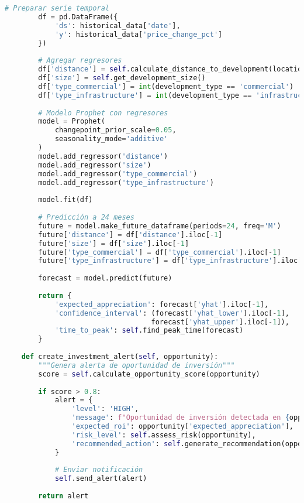 \documentclass[12pt,a4paper]{article}
\begin{document}
\begin{lstlisting}[language=Python, caption=Detección de cambios urbanos y predicción de plusvalía]
        # Preparar serie temporal
        df = pd.DataFrame({
            'ds': historical_data['date'],
            'y': historical_data['price_change_pct']
        })
        
        # Agregar regresores
        df['distance'] = self.calculate_distance_to_development(location)
        df['size'] = self.get_development_size()
        df['type_commercial'] = int(development_type == 'commercial')
        df['type_infrastructure'] = int(development_type == 'infrastructure')
        
        # Modelo Prophet con regresores
        model = Prophet(
            changepoint_prior_scale=0.05,
            seasonality_mode='additive'
        )
        model.add_regressor('distance')
        model.add_regressor('size')
        model.add_regressor('type_commercial')
        model.add_regressor('type_infrastructure')
        
        model.fit(df)
        
        # Predicción a 24 meses
        future = model.make_future_dataframe(periods=24, freq='M')
        future['distance'] = df['distance'].iloc[-1]
        future['size'] = df['size'].iloc[-1]
        future['type_commercial'] = df['type_commercial'].iloc[-1]
        future['type_infrastructure'] = df['type_infrastructure'].iloc[-1]
        
        forecast = model.predict(future)
        
        return {
            'expected_appreciation': forecast['yhat'].iloc[-1],
            'confidence_interval': (forecast['yhat_lower'].iloc[-1], 
                                   forecast['yhat_upper'].iloc[-1]),
            'time_to_peak': self.find_peak_time(forecast)
        }
    
    def create_investment_alert(self, opportunity):
        """Genera alerta de oportunidad de inversión"""
        score = self.calculate_opportunity_score(opportunity)
        
        if score > 0.8:
            alert = {
                'level': 'HIGH',
                'message': f"Oportunidad de inversión detectada en {opportunity['location']}",
                'expected_roi': opportunity['expected_appreciation'],
                'risk_level': self.assess_risk(opportunity),
                'recommended_action': self.generate_recommendation(opportunity)
            }
            
            # Enviar notificación
            self.send_alert(alert)
            
        return alert
\end{lstlisting}
\end{document}
